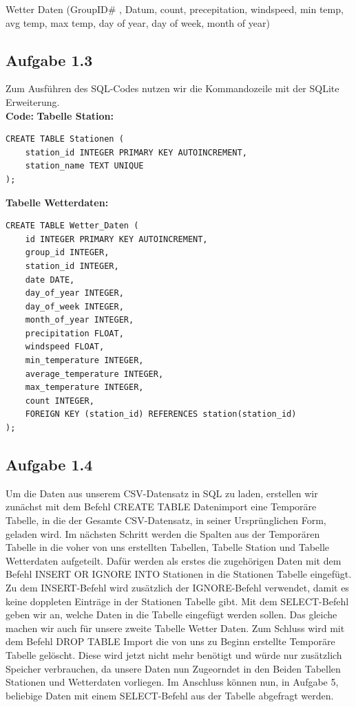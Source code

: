\documentclass[a4paper, 12pt]{article}
\begin{document}
Wetter Daten (GroupID# , Datum, count, precepitation, windspeed, min temp, avg temp, max temp, day of year, day of week, month of year)

\subsection{Aufgabe 1.3}
Zum Ausführen des SQL-Codes nutzen wir die Kommandozeile mit der SQLite Erweiterung.
\\

\textbf{Code:} \newline
\textbf{Tabelle Station:}
\begin{verbatim}
CREATE TABLE Stationen ( 
    station_id INTEGER PRIMARY KEY AUTOINCREMENT,
    station_name TEXT UNIQUE 
);
\end{verbatim}

\textbf{Tabelle Wetterdaten:}
\begin{verbatim}
CREATE TABLE Wetter_Daten (
    id INTEGER PRIMARY KEY AUTOINCREMENT,
    group_id INTEGER,
    station_id INTEGER,
    date DATE,
    day_of_year INTEGER,
    day_of_week INTEGER,
    month_of_year INTEGER,
    precipitation FLOAT,
    windspeed FLOAT,
    min_temperature INTEGER,
    average_temperature INTEGER,
    max_temperature INTEGER,
    count INTEGER,
    FOREIGN KEY (station_id) REFERENCES station(station_id)
);    
\end{verbatim}



\newpage
\subsection{Aufgabe 1.4}
Um die Daten aus unserem CSV-Datensatz in SQL zu laden, erstellen wir zunächst mit dem Befehl CREATE TABLE Datenimport eine Temporäre Tabelle, in die der Gesamte CSV-Datensatz, in seiner Ursprünglichen Form, geladen wird. Im nächsten Schritt werden die Spalten aus der Temporären Tabelle in  die voher von uns erstellten Tabellen, Tabelle Station und Tabelle Wetterdaten aufgeteilt. Dafür werden als erstes die zugehörigen Daten mit dem Befehl INSERT OR IGNORE INTO Stationen in die Stationen Tabelle eingefügt. Zu dem INSERT-Befehl wird zusätzlich der IGNORE-Befehl verwendet, damit es keine doppleten Einträge in der Stationen Tabelle gibt. Mit dem SELECT-Befehl geben wir an, welche Daten in die Tabelle eingefügt werden sollen. Das gleiche machen wir auch für unsere zweite Tabelle Wetter Daten. Zum Schluss wird mit dem Befehl DROP TABLE Import die von uns zu Beginn erstellte Temporäre Tabelle gelöscht. Diese wird jetzt nicht mehr benötigt und würde nur zusätzlich Speicher verbrauchen, da unsere Daten nun Zugeorndet in den Beiden Tabellen Stationen und Wetterdaten vorliegen. Im Anschluss können nun, in Aufgabe 5, beliebige Daten mit einem SELECT-Befehl aus der Tabelle abgefragt werden.
\end{document}
